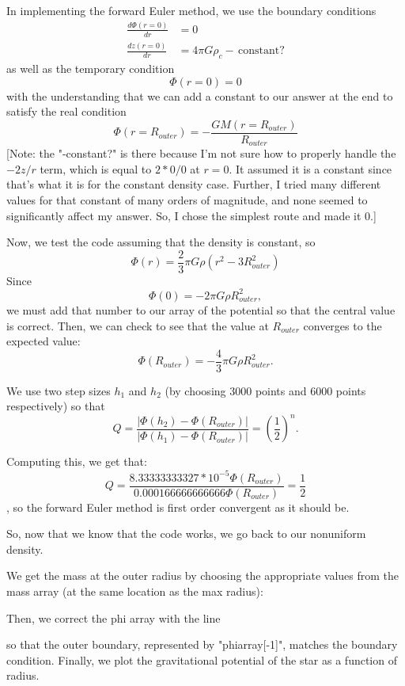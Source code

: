 \documentclass[11pt,letterpaper]{article}
\newcommand{\unit}[1]{\ensuremath{\, \mathrm{#1}}}
\begin{document}
In implementing the forward Euler method, we use the boundary conditions 
\begin{align*}
\frac{d\Phi(r=0)}{dr} &= 0\\
\frac{dz(r=0)}{dr} &= 4\pi G\rho_c - \unit{constant}?
\end{align*}
as well as the temporary condition
$$\Phi(r=0) = 0$$
with the understanding that we can add a constant to our answer at the end to satisfy the 
real condition
$$\Phi(r=R_{outer}) = -\frac{GM(r=R_{outer})}{R_{outer}}$$
[Note: the "-constant?" is there because I'm not sure how to properly handle the
$-2z / r$ term, which is equal to $2*0/0$ at $r=0$. It assumed it is a 
constant since that's what it is for the constant density case. Further, I tried many 
different values for that constant of many orders of magnitude, and none seemed to 
significantly affect my answer. So, I chose the simplest route and made it 0.]

Now, we test the code assuming that the density is constant, so 
$$\Phi(r) = \frac{2}{3}\pi G \rho (r^2 - 3R_{outer}^2) $$
Since 
$$\Phi(0) = -2\pi G \rho R_{outer}^2, $$
we must add that number to our array of the potential so that the central value is 
correct. Then, we can check to see that the value at $R_{outer}$ converges to the 
expected value:
$$\Phi(R_{outer}) = -\frac{4}{3}\pi G \rho R_{outer}^2. $$

We use two step sizes $h_1$ and $h_2$ (by choosing 3000 points and 6000 points 
respectively) so that 
$$ Q = \frac{|\Phi(h_2) - \Phi(R_{outer})|}{|\Phi(h_1) - \Phi(R_{outer})|} = 
\left(\frac{1}{2}\right)^n. $$

Computing this, we get that:
$$ Q = \frac{8.33333333327*10^{-5}\Phi(R_{outer})}{0.000166666666666\Phi(R_{outer})}
= \frac{1}{2} $$,
so the forward Euler method is first order convergent as it should be. 

So, now that we know that the code works, we go back to our nonuniform density. 

We get the mass at the outer radius by choosing the appropriate values from the mass
array (at the same location as the max radius):

Then, we correct the phi array with the line

so that the outer boundary, represented by "phiarray[-1]", matches the boundary
condition. Finally, we plot the gravitational potential of the star as a 
function of radius.
\end{document}
